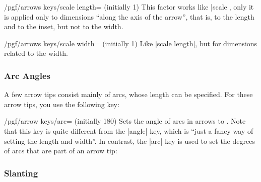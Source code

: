 \begin{key}{/pgf/arrows keys/scale length= (initially 1)}
    This factor works like |scale|, only it is applied only to dimensions
    ``along the axis of the arrow'', that is, to the length and to the inset,
    but not to the width.
\begin{codeexample}[]
\end{codeexample}
\end{key}

\begin{key}{/pgf/arrows keys/scale width= (initially 1)}
    Like |scale length|, but for dimensions related to the width.
\begin{codeexample}[]
\end{codeexample}
\end{key}


\subsubsection{Arc Angles}

A few arrow tips consist mainly of arcs, whose length can be specified. For
these arrow tips, you use the following key:

\begin{key}{/pgf/arrow keys/arc= (initially 180)}
    Sets the angle of arcs in arrows to . Note that this key is
    quite different from the |angle| key, which is ``just a fancy way of
    setting the length and width''. In contrast, the |arc| key is used to set
    the degrees of arcs that are part of an arrow tip:
\begin{codeexample}[]
\end{codeexample}
\end{key}


\subsubsection{Slanting}

